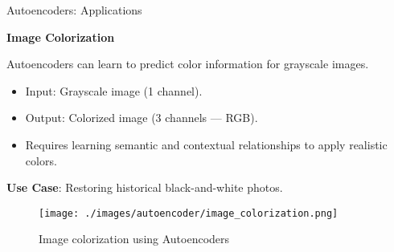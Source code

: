 \begin{frame}[allowframebreaks]{Autoencoders: Applications}
\framebreak

\textbf{Image Colorization}

Autoencoders can learn to predict color information for grayscale images.

\begin{itemize}
    \item Input: Grayscale image (1 channel).
    \item Output: Colorized image (3 channels — RGB).
    \item Requires learning semantic and contextual relationships to apply realistic colors.
\end{itemize}
\textbf{Use Case}: Restoring historical black-and-white photos.

\framebreak

\begin{figure}
    \centering
    \texttt{[image: ./images/autoencoder/image\_colorization.png]}
    \caption{Image colorization using Autoencoders}
\end{figure}

\end{frame}